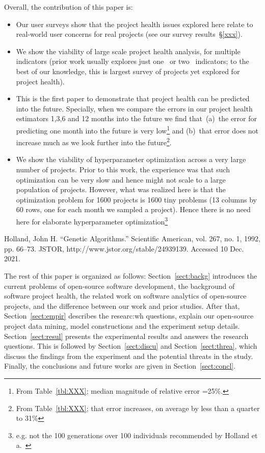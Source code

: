\documentclass[smallextended]{svjour3}
\newcommand{\bi}{\begin{itemize}}
\newcommand{\ei}{\end{itemize}}
\newcommand{\tbl}[1]{Table~\ref{tbl:#1}}
\begin{document}
Overall, the contribution of this paper is:
\bi
\item Our user surveys show that the project health issues  explored here relate to real-world user concerns for real projects (see our survey results~\S\ref{xxx}).
\item We show the viability of large scale project health analysis, for multiple indicators (prior work usually explores just one~\cite{xx} or two~\cite{xx} indicators;
to the best of our knowledge, this is largest survey of projects yet explored for project health).
\item This is the first paper to demonstrate that project health can be predicted  into the future. Specially, when we compare the errors in our project health estimators 1,3,6 and 12 months into the future we find that~(a)~the error for predicting one month into the future is very low\footnote{
From \tbl{XXX}; median magnitude of relative error =25\%.} and (b)~that error does not increase much as we look further into the future\footnote{
From \tbl{XXX}; that error increases, on average by less than a quarter  to 31\%}.
\item We show the viability
of hyperparameter optimization
across a very large number of projects.
Prior to this work, the experience was that such optimization can be very slow and hence might not scale to a large population of projects. However, what was realized here is that the optimization problem
for 1600 projects is 1600 tiny problems (13 columns by 60 rows, one for each month we sampled a project). Hence there is no need here for elaborate hyperparameter optimization\footnote{e.g. not the 100 generations over 100 individuals recommended by Holland et a.~\cite{holland1992genetic}}
\ei
 
Holland, John H. “Genetic Algorithms.” Scientific American, vol. 267, no. 1, 1992, pp. 66–73. JSTOR, http://www.jstor.org/stable/24939139. Accessed 10 Dec. 2021. 


The rest of this paper is organized as follows:
Section~\ref{sect:backg} introduces the current problems of open-source software development, the background of software project health, the related work on software analytics of open-source projects, and the difference between our work and prior studies.
After that, Section~\ref{sect:empir} describes the researc:wh questions, explain our open-source project data mining, model constructions and the experiment setup details. 
Section~\ref{sect:resul} presents the experimental results and answers the research questions. 
This is followed by Section~\ref{sect:discu} and Section~\ref{sect:threa}, which discuss the findings from the experiment and the potential threats in the study. 
Finally, the conclusions and future works are given in Section~\ref{sect:concl}.
\end{document}
